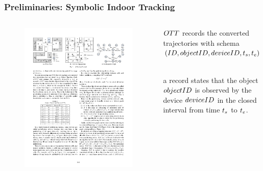 
\begin{frame}
\frametitle{Preliminaries: Symbolic Indoor Tracking}

\begin{columns}[c]
  \begin{figure}[tb]
    \includegraphics[width=\columnwidth]{figures/2-4/2-4-2.pdf}
  \end{figure}

  \begin{fitemize}
    \item {} $\mathnormal{OTT}$ records the converted trajectories with schema $\mathnormal{(ID, objectID, deviceID, t_s, t_e)}$
    ~\\
    \item a record states that the object $\mathnormal{objectID}$ is observed by the device $\mathnormal{deviceID}$ in the closed interval from time $\mathnormal{t_s}$ to $\mathnormal{t_e}$.
  \end{fitemize}

\end{columns}

\end{frame}

